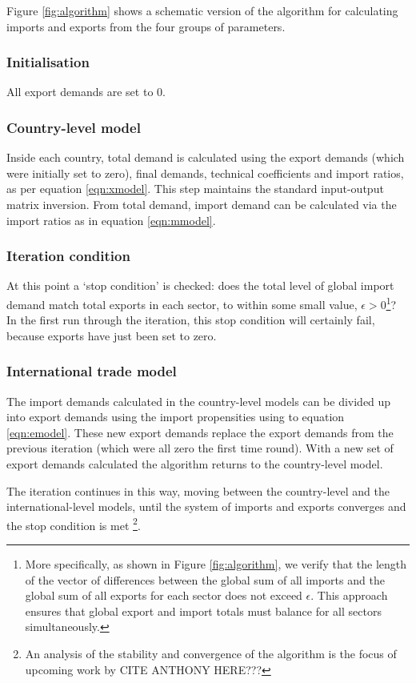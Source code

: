 \documentclass[a4paper]{article}
\begin{document}
Figure \ref{fig:algorithm} shows a schematic version of the algorithm for calculating imports and exports from the four groups of parameters.
\subsubsection*{Initialisation}
All export demands are set to 0.

\subsubsection*{Country-level model}
Inside each country, total demand is calculated using the export demands (which were initially set to zero), final demands, technical coefficients and import ratios, as per equation \eqref{eqn:xmodel}.
This step maintains the standard input-output matrix inversion.
From total demand, import demand can be calculated via the import ratios as in equation \eqref{eqn:mmodel}.

\subsubsection*{Iteration condition}
At this point a `stop condition' is checked: does the total level of global import demand match total exports in each sector, to within some small value,  $\epsilon > 0$\footnote{More specifically, as shown in Figure \ref{fig:algorithm}, we verify that the length of the vector of differences between the global sum of all imports and the global sum of all exports for each sector does not exceed $\epsilon$. This approach ensures that global export and import totals must balance for all sectors simultaneously.}?
In the first run through the iteration, this stop condition will certainly fail, because exports have just been set to zero.

\subsubsection*{International trade model}
The import demands calculated in the country-level models can be divided up into export demands using the import propensities using to equation \eqref{eqn:emodel}.
These new export demands replace the export demands from the previous iteration (which were all zero the first time round).
With a new set of export demands calculated the algorithm returns to the country-level model.

The iteration continues in this way, moving between the country-level and the international-level models, until the system of imports and exports converges and the stop condition is met \footnote{An analysis of the stability and convergence of the algorithm is the focus of upcoming work by CITE ANTHONY HERE???}.
\end{document}
